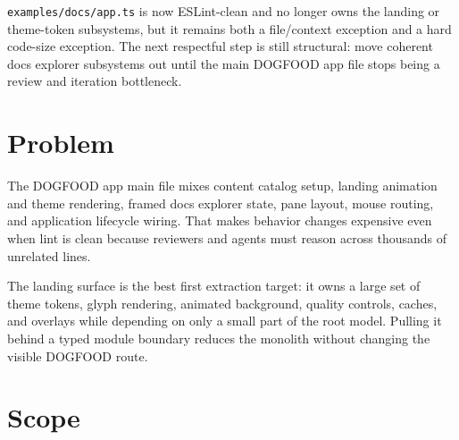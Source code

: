 \texttt{e\allowbreak{}x\allowbreak{}a\allowbreak{}m\allowbreak{}p\allowbreak{}l\allowbreak{}e\allowbreak{}s\allowbreak{}/\allowbreak{}d\allowbreak{}o\allowbreak{}c\allowbreak{}s\allowbreak{}/\allowbreak{}a\allowbreak{}p\allowbreak{}p\allowbreak{}.\allowbreak{}t\allowbreak{}s} is now ESLint-clean and no longer owns the landing or theme-token subsystems, but it remains both a file/context exception and a hard code-size exception. The next respectful step is still structural: move coherent docs explorer subsystems out until the main DOGFOOD app file stops being a review and iteration bottleneck.

\section{Problem}\label{record-117-problem}

The DOGFOOD app main file mixes content catalog setup, landing animation and theme rendering, framed docs explorer state, pane layout, mouse routing, and application lifecycle wiring. That makes behavior changes expensive even when lint is clean because reviewers and agents must reason across thousands of unrelated lines.

The landing surface is the best first extraction target: it owns a large set of theme tokens, glyph rendering, animated background, quality controls, caches, and overlays while depending on only a small part of the root model. Pulling it behind a typed module boundary reduces the monolith without changing the visible DOGFOOD route.

\section{Scope}\label{record-117-scope}

